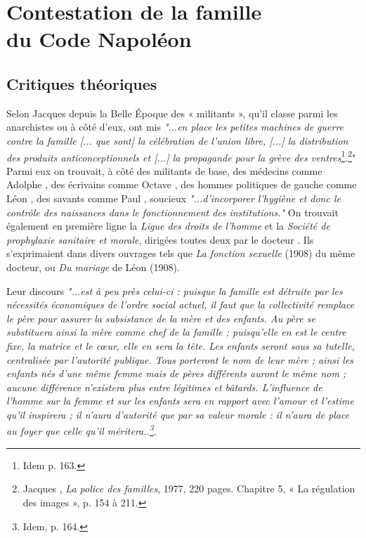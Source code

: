 

\chapter[Contestation de la famille du Code Napoléon]{Contestation de la famille\\du Code Napoléon}


\section{Critiques théoriques}

 

Selon Jacques  depuis la Belle Époque des « militants », qu'il classe parmi les anarchistes ou à côté d'eux, ont mis {\emph{"...en place les petites machines de guerre contre la famille \emph{[... que sont]} la célébration de l'union libre, \emph{[...]} la distribution des produits anticonceptionnels et \emph{[...]} la propagande pour la grève des ventres}\footnote{Idem p. 163.}.}\footnote{Jacques , \emph{La police des familles}, 1977, 220 pages. Chapitre 5, « La régulation des images », p. 154 à 211.}" 
Parmi eux on trouvait, à côté des militants de base, des médecins comme Adolphe , des écrivains comme Octave , des hommes politiques de gauche comme Léon , des savants comme Paul , soucieux {\emph{"...d'incorporer l'hygiène et donc le contrôle des naissances dans le fonctionnement des institutions."}} On trouvait également en première ligne la \emph{Ligue des droits de l'homme} et la \emph{Société de prophylaxie sanitaire et morale}, dirigées toutes deux par le docteur . Ils s'exprimaient dans divers ouvrages tels que \emph{La fonction sexuelle} (1908) du même docteur, ou \emph{Du mariage} de Léon  (1908). 

Leur discours \emph{"...est à peu près celui-ci : puisque la famille est détruite par les nécessités économiques de l'ordre social actuel, il faut que la collectivité remplace le père pour assurer la subsistance de la mère et des enfants. Au père se substituera ainsi la mère comme chef de la famille ; puisqu'elle en est le centre fixe, la matrice et le cœur, elle en sera la tête. Les enfants seront sous sa tutelle, centralisée par l'autorité publique. Tous porteront le nom de leur mère ; ainsi les enfants nés d'une même femme mais de pères différents auront le même nom ; aucune différence n'existera plus entre légitimes et bâtards. L'influence de l'homme sur la femme et sur les enfants sera en rapport avec l'amour et l'estime qu'il inspirera ; il n'aura d'autorité que par sa valeur morale : il n'aura de place au foyer que celle qu'il méritera..\footnote{Idem, p. 164.}.} 

